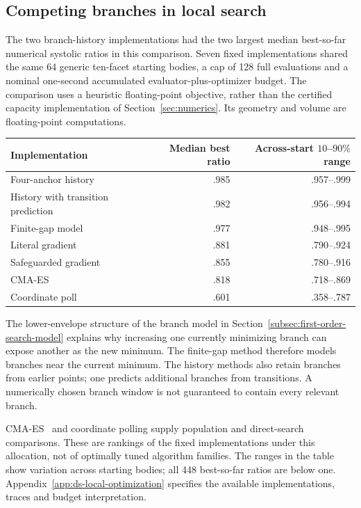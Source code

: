 \subsection{Competing branches in local search}
\label{subsec:black-box-datascience-finite-budget-optimization}

The two branch-history implementations had the two largest median
best-so-far numerical systolic ratios in this comparison. Seven fixed
implementations shared the same 64 generic ten-facet starting bodies, a cap
of 128 full evaluations and a nominal one-second accumulated
evaluator-plus-optimizer budget. The comparison uses a heuristic
floating-point objective, rather than the certified capacity implementation
of Section~\ref{sec:numerics}. Its geometry and volume are floating-point
computations.
\begin{center}
\begin{tabular}{lrr}
\hline
Implementation & Median best ratio & Across-start $10$--$90\%$ range\\
\hline
Four-anchor history & .985 & .957--.999\\
History with transition prediction & .982 & .956--.994\\
Finite-gap model & .977 & .948--.995\\
Literal gradient & .881 & .790--.924\\
Safeguarded gradient & .855 & .780--.916\\
CMA-ES & .818 & .718--.869\\
Coordinate poll & .601 & .358--.787\\
\hline
\end{tabular}
\end{center}
The lower-envelope structure of the branch model in
Section~\ref{subsec:first-order-search-model} explains why increasing one
currently minimizing branch can expose another as the new minimum. The
finite-gap method therefore models branches near the current minimum.
The history methods also retain branches from earlier points; one predicts
additional branches from transitions. A numerically chosen branch window
is not guaranteed to contain every relevant branch.

CMA-ES~\cite{dsHansen2016} and coordinate polling supply population and
direct-search comparisons. These are rankings of the fixed implementations
under this allocation, not of optimally tuned algorithm families. The ranges
in the table show variation across starting bodies; all 448 best-so-far
ratios are below one. Appendix~\ref{app:ds-local-optimization} specifies the
available implementations, traces and budget interpretation.

